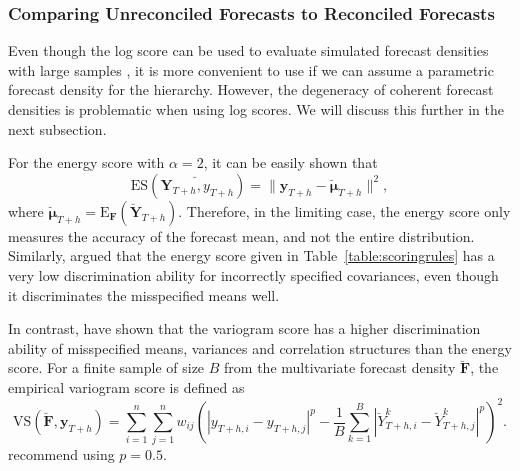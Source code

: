 \documentclass[a4paper, 11pt]{article}
\def\E{\text{E}}
\theoremstyle{theo}
\theoremstyle{definition}
\begin{document}
\subsubsection{Comparing Unreconciled Forecasts to Reconciled Forecasts}


Even though the log score can be used to evaluate simulated forecast densities with large samples \citep{Jordan2017}, it is more convenient to use if we can assume a parametric forecast density for the hierarchy. However, the degeneracy of coherent forecast densities is problematic when using log scores. We will discuss this further in the next subsection.

For the energy score with $\alpha=2$, it can be easily shown that
\begin{equation} \label{eq:(5.1)}
\text{ES}(\breve{\bm{Y}_{T+h},y_{T+h}}) = \|\bm{y}_{T+h}-\breve{\bm{\mu}}_{T+h}\|^2,
\end{equation}
where $\breve{\bm{\mu}}_{T+h} =\E_{\bm{F}}(\breve{\bm{Y}}_{T+h}) $. Therefore, in the limiting case, the energy score only measures the accuracy of the forecast mean, and not the entire distribution. Similarly, \citet{Pinson2013a} argued that the energy score given in Table~\ref{table:scoringrules} has a very low discrimination ability for incorrectly specified covariances, even though it discriminates the misspecified means well.

In contrast, \citet{SCHEUERER2015} have shown that the variogram score has a higher discrimination ability of misspecified means, variances and correlation structures than the energy score. For a finite sample of size $B$ from the multivariate forecast density $\breve{\bm{F}}$, the empirical variogram score is defined as
\begin{equation}
\text{VS}(\breve{\bm{F}}, \bm{y}_{T+h}) = \displaystyle\sum_{i=1}^{n}\displaystyle\sum_{j=1}^{n}w_{ij}\left(|y_{T+h,i} - y_{T+h,j}|^p - \frac{1}{B} \displaystyle\sum_{k=1}^{B} |\breve{Y}^k_{T+h,i}-\breve{Y}^k_{T+h,j}|^p\right)^2.
\end{equation}
\citet{SCHEUERER2015} recommend using $p=0.5$. 

\end{document}
